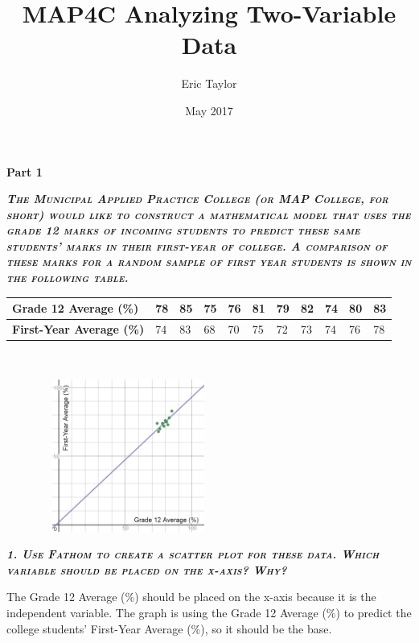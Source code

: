 \documentclass{article}
\title{MAP4C Analyzing Two-Variable Data}
\author{Eric Taylor}
\date{May 2017}
\begin{document}
\topmargin=0pt %
\headheight=0pt %
\headsep=0pt %
\footskip=0pt %
\textheight=700pt %

\setlength{\parindent}{0pt} %

\captionsetup[figure]{labelformat=empty} %

\maketitle \thispagestyle{empty}

\textbf{{\huge Part 1}}

\textbf{\emph{\textsc{The Municipal Applied Practice College (or MAP College, for short) would like to construct a mathematical model that uses the grade 12 marks of incoming students to predict these same students' marks in their first-year of college. A comparison of these marks for a random sample of first year students is shown in the following table.}}}

\begin{tabular}{|l|l|l|l|l|l|l|l|l|l|l|}
    \hline \textbf{Grade 12 Average (\%)} & 78 & 85 & 75 & 76 & 81 & 79 & 82 & 74 & 80 & 83
    \\ \hline
    \textbf{First-Year Average (\%)} & 74 & 83 & 68 & 70 & 75 & 72 & 73 & 74 & 76 & 78 
    \\ \hline
\end{tabular} \\

\begin{center}
    \includegraphics[width=8cm, height=5cm]{partone-graph}
\end{center}

\textbf{\emph{\textsc{1. Use Fathom to create a scatter plot for these data. Which variable should be placed on the x-axis? Why?}}}

The Grade 12 Average (\%) should be placed on the x-axis because it is the independent variable. The graph is using the Grade 12 Average (\%) to predict the college students' First-Year Average (\%), so it should be the base.
\end{document}
